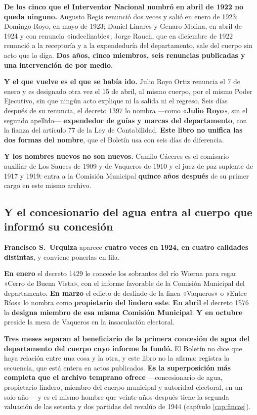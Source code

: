 \begin{cautela}
\textbf{De los cinco que el Interventor Nacional nombró en abril de 1922 no queda ninguno.}
Augusto Regis renunció dos veces y salió en enero de 1923; Domingo Royo, en
mayo de 1923; Daniel Linares y Genaro Molina, en abril de 1924 y con renuncia «indeclinable»;
Jorge Rauch, que en diciembre de 1922 renunció a la receptoría y a la expendeduría del departamento, sale del cuerpo sin acto que lo diga. \textbf{Dos años, cinco miembros, seis
renuncias publicadas y una intervención de por medio.}

\textbf{Y el que vuelve es el que se había ido.} Julio Royo Ortiz renuncia el 7 de enero y es
designado otra vez el 15 de abril, al mismo cuerpo, por el mismo Poder Ejecutivo, sin que ningún
acto explique ni la salida ni el regreso. Seis días después de su renuncia, el decreto 1397 lo
nombra ---como «\textbf{Julio Royo}», sin el segundo apellido--- \textbf{expendedor de guías y
marcas del departamento}, con la fianza del artículo 77 de la Ley de Contabilidad. \textbf{Este
libro no unifica las dos formas del nombre}, que el Boletín usa con seis días de diferencia.

\textbf{Y los nombres nuevos no son nuevos.} Camilo Cáceres es el comisario auxiliar de Los
Sauces de 1909 y de Vaqueros de 1910 y el juez de paz suplente de 1917 y 1919: entra a la
Comisión Municipal \textbf{quince años después} de su primer cargo en este mismo archivo.
\end{cautela}

\subsection*{Y el concesionario del agua entra al cuerpo que informó su concesión}

\begin{cautela}
\textbf{Francisco S.\ Urquiza} aparece \textbf{cuatro veces en
1924, en cuatro calidades distintas}, y conviene ponerlas en fila.

\textbf{En enero} el decreto 1429 le concede los sobrantes del río Wierna para regar «Cerro de
Buena Vista», con el informe favorable de la Comisión Municipal del departamento.
\textbf{En marzo} el edicto de deslinde de la finca «Vaqueros» o «Entre Ríos» lo nombra como
\textbf{propietario del lindero este}. \textbf{En abril} el decreto 1576 lo \textbf{designa
miembro de esa misma Comisión Municipal}. \textbf{Y en octubre} preside la mesa de Vaqueros en
la insaculación electoral.

\textbf{Tres meses separan al beneficiario de la primera concesión de agua del departamento del
cuerpo cuyo informe la fundó.} El Boletín no dice que haya relación entre una cosa y la otra, y
este libro no la afirma: registra la secuencia, que está entera en actos publicados. \textbf{Es
la superposición más completa que el archivo temprano ofrece} ---concesionario de agua,
propietario lindero, miembro del cuerpo municipal y autoridad electoral, en un solo año--- y es
el mismo hombre que veinte años después tiene la segunda valuación de las setenta y dos partidas
del revalúo de 1944 (capítulo \ref{cap:fincas}).
\end{cautela}

